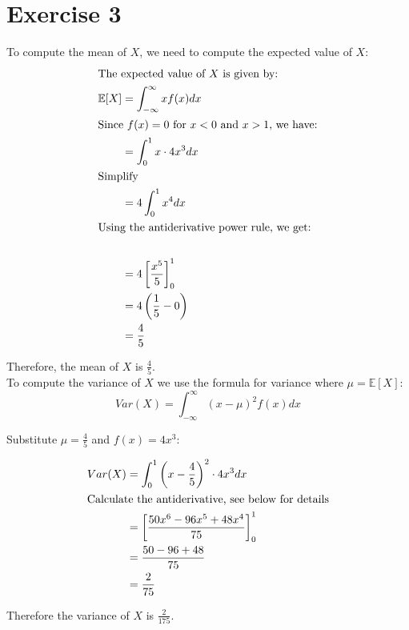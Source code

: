 \section{Exercise 3}

To compute the mean of $X$, we need to compute the expected value of $X$:
\begin{align*}
	\intertext{The expected value of $X$ is given by:}
	\mathbb{E}[X] & = \int_{-\infty}^{\infty} x f(x) dx      \\
	\intertext{Since $f(x) = 0$ for $x < 0$ and $x > 1$, we have:}
	              & = \int_{0}^{1} x \cdot 4x^3 dx           \\
	\intertext{Simplify}
	              & = 4 \int_{0}^{1} x^4 dx                  \\
	\intertext{Using the antiderivative power rule, we get:} \\
	              & = 4 \left[ \frac{x^5}{5} \right]_{0}^{1} \\
	              & = 4 \left( \frac{1}{5} - 0 \right)       \\
	              & = \frac{4}{5}
\end{align*}

Therefore, the mean of $X$ is $\frac{4}{5}$.\\[1em]

To compute the variance of $X$ we use the formula for variance where $\mu = \mathbb{E}[X]$:
\[
	Var(X) = \int_{-\infty}^{\infty} (x - \mu)^2 f(x) dx
\]

Substitute $\mu = \frac{4}{5}$ and $f(x) = 4x^3$:

\begin{align*}
	Var(X) & = \int_{0}^{1} \left(x - \frac{4}{5}\right)^2 \cdot 4x^3 dx \\
	\intertext{Calculate the antiderivative, see below for details}
	       & = \left[\frac{50x^6 - 96x^5 + 48x^4}{75}\right]_{0}^{1}     \\
	       & = \frac{50 - 96 + 48}{75}                                   \\
	       & = \frac{2}{75}
\end{align*}

Therefore the variance of $X$ is $\frac{2}{175}$.

